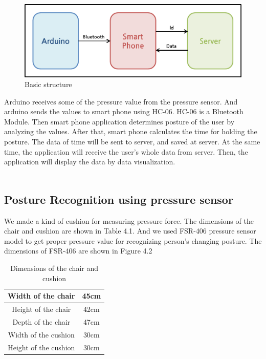 \documentclass[conference]{IEEEtran}
\begin{document}
\begin{figure}[H]
\begin{center}
    \includegraphics[scale=0.55]{img_04.png}
    \caption{Basic structure} 
\end{center}
\end{figure}


 Arduino receives some of the pressure value from the pressure sensor. And arduino sends the values to smart phone using HC-06. HC-06 is a Bluetooth Module. Then smart phone application determines posture of the user by analyzing the values. After that, smart phone calculates the time for holding the posture. The data of time will be sent to server, and saved at server.
At the same time, the application will receive the user's whole data from server. Then, the application will display the data by data visualization.\\\\

\subsection{Posture Recognition using pressure sensor}
 We made a kind of cushion for measuring pressure force. The dimensions of the chair and cushion are shown in Table 4.1. And we used FSR-406 pressure sensor model to get proper pressure value for recognizing person's changing posture. The dimensions of FSR-406 are shown in Figure 4.2\\
 
 \begin{table}[h]
{\renewcommand\arraystretch{1.25}
\caption{Dimensions of the chair and cushion}
\begin{tabular}{|c|cc}  \hline\hline
Width of the chair& \multicolumn{2}{p{5cm}|}{\raggedright 45cm} \\ \hline
Height of the chair& \multicolumn{2}{p{5cm}|}{\raggedright 42cm} \\ \hline
Depth of the chair& \multicolumn{2}{p{5cm}|}{\raggedright 47cm} \\ \hline
Width of the cushion& \multicolumn{2}{p{5cm}|}{\raggedright 30cm} \\ \hline
Height of the cushion& \multicolumn{2}{p{5cm}|}{\raggedright 30cm} \\ \hline \hline
\end{tabular}}
\end{table}
\end{document}
